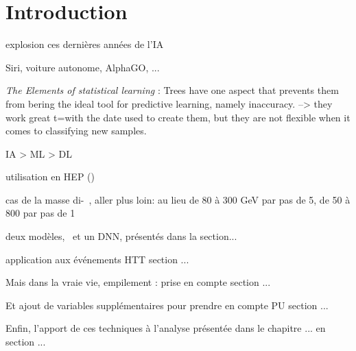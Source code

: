 \section{Introduction}\label{chapter-ML-section-intro}

explosion ces dernières années de l'IA

Siri, voiture autonome, AlphaGO, ...

\emph{The Elements of statistical learning} : Trees have one aspect that prevents them from bering the ideal tool for predictive learning, namely inaccuracy.
--> they work great t=with the date used to create them, but they are not flexible when it comes to classifying new samples.

IA > ML > DL

utilisation en HEP (\cite{jet_flavor_deep_nn,BARTSCHI201929,Gael_thesis})

cas de la masse di-\tau~\cite{BARTSCHI201929}, aller plus loin:
au lieu de 80 à 300 GeV par pas de 5, de 50 à 800 par pas de 1

deux modèles, \XGB\ et un DNN, présentés dans la section...

application aux événements HTT section ...

Mais dans la vraie vie, empilement : prise en compte section ...

Et ajout de variables supplémentaires pour prendre en compte PU section ...

Enfin, l'apport de ces techniques à l'analyse présentée dans le chapitre ... en section ...
